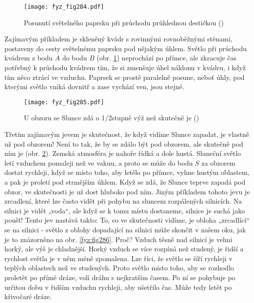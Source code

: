     \begin{figure}[ht!] %
      \centering
      \texttt{[image: fyz\_fig284.pdf]}
      \caption{Posunutí světelného paprsku při průchodu průhlednou destičkou
               (\cite[s.~350]{Feynman01})}
      \label{fyz:fig284}
    \end{figure}

    Zajímavým příkladem je skleněný kvádr s rovinnými rovnoběžnými stěnami, postaveny do cesty 
    světelnému paprsku pod nějakým úhlem. Světlo při průchodu kvádrem z bodu \(A\) do bodu \(B\) 
    (obr. \ref{fyz:fig284}) neprochází po přímce, ale zkracuje čas potřebný k průchodu kvádrem tím, 
    že si zmenšuje úhel náklonu v kvádru, i když tím něco ztrácí ve vzduchu. Paprsek se prostě 
    paralelně posune, neboť úhly, pod kterými světlo vniká dovnitř a zase vychází ven, jsou stejné.
    
    \begin{figure}[ht!] %
      \centering
      \texttt{[image: fyz\_fig285.pdf]}
      \caption{U obzoru se Slunce zdá o 1/2stupně výž než skutečně je 
               (\cite[s.~350]{Feynman01})}
      \label{fyz:fig285}
    \end{figure}
    
    Třetím zajímavým jevem je skutečnost, že když vidíme Slunce zapadat, je vlastně už pod obzorem! 
    Není to tak, že by se zdálo být pod obzorem, ale skutečně pod ním je (obr. \ref{fyz:fig285}). 
    Zemská atmosféra je nahoře řídká a dole hustá. Sluneční světlo letí vzduchem pomaleji než ve 
    vakuu, a proto se může do bodu \(S\) za obzorem dostat rychleji, když se místo toho, aby letělo 
    po přímce, vyhne hustým oblastem, a pak je proletí pod strmějším úhlem. Když se zdá, že Slunce 
    teprve zapadá pod obzor, ve skutečnosti je už dost hluboko pod ním. Jiným příkladem tohoto jevu 
    je zrcadlení, které lze často vidět při pohybu na sluncem rozpálených silnicích. Na silnici je 
    vidět „voda“, ale když se k tomu místu dostaneme, silnice je suchá jako poušť! Tento jev 
    nastává takto: To, co ve skutečnosti vidíme, je obloha „zrcadlící“ se na silnici - světlo z 
    oblohy dopadající na silnici může skončit v našem oku, jak je to znázorněno na obr. 
    \ref{fyz:fig286}. Proč? Vzduch těsně nad silnicí je velmi horký, ale výš je chladnější. Horký 
    vzduch se více rozpíná než studený, je řidší a rychlost světla je v něm méně zpomalena. Lze 
    říci, že světlo se šíří rychleji v teplých oblastech než ve studených. Proto světlo místo toho, 
    aby se rozhodlo proletět po přímé dráze, volí dráhu s nejkratším časem. Po ní se pohybuje po 
    určitou dobu v řidším vzduchu rychleji, aby ušetřilo čas. Může tedy letět po křivočaré dráze.
    
